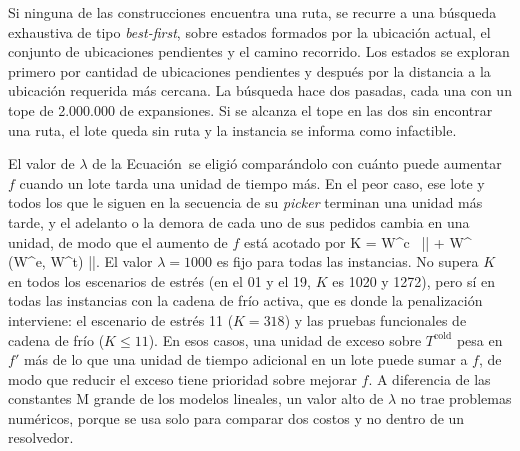 Si ninguna de las construcciones encuentra una ruta, se recurre a una
búsqueda exhaustiva de tipo {\em best-first}, sobre estados formados por la
ubicación actual, el conjunto de ubicaciones pendientes y el camino recorrido.
Los estados se exploran primero por cantidad de ubicaciones pendientes y
después por la distancia a la ubicación requerida más cercana. La búsqueda
hace dos pasadas, cada una con un tope de 2.000.000 de expansiones. Si se
alcanza el tope en las dos sin encontrar una ruta, el lote queda sin ruta y la instancia se informa como infactible.

\stopsubsection

\stopsection

\startsection[title={Otros detalles de implementación}, reference=sec:anexo_impl]

\startsubsection[title={Peso de la penalización}, reference=sec:anexo_lambda]

El valor de $\lambda$ de la Ecuación~\in[eq:hc_costo] se eligió comparándolo
con cuánto puede aumentar $f$ cuando un lote tarda una unidad de tiempo más.
En el peor caso, ese lote y todos los que le siguen en la secuencia de su
{\em picker} terminan una unidad más tarde, y el adelanto o la demora de cada
uno de sus pedidos cambia en una unidad, de modo que el aumento de $f$ está
acotado por
\startformula
	K = W^{c} \, || + W^{} \max\left(W^{e}, W^{t}\right) ||.
\stopformula
El valor $\lambda = 1000$ es fijo para todas las instancias. No supera $K$ en
todos los escenarios de estrés (en el 01 y el 19, $K$ es 1020 y 1272), pero
sí en todas las instancias con la cadena de frío activa, que es donde la
penalización interviene: el escenario de estrés 11 ($K = 318$) y las pruebas
funcionales de cadena de frío ($K \leq 11$). En esos casos, una unidad de exceso sobre $T^{\text{cold}}$ pesa en $f'$
más de lo que una unidad de tiempo adicional en un lote puede sumar a $f$,
de modo que reducir el exceso tiene prioridad sobre mejorar $f$. A
diferencia de las constantes M grande de los modelos lineales, un valor alto
de $\lambda$ no trae problemas numéricos, porque se usa solo para comparar
dos costos y no dentro de un resolvedor.

\stopsubsection

\startsubsection[title={Evaluación incremental en \ac{hc}}, reference=sec:anexo_incremental]

